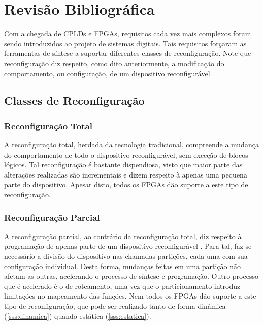 \documentclass[11pt,a4paper,oneside]{book}
\begin{document}
	\frontmatter
	\tableofcontents
	\mainmatter
	
\fi
                      
\chapter{Revis\~{a}o Bibliogr\'{a}fica}\label{CapRevisaoBibliografica}


\vspace{0.8cm}
Com a chegada de CPLDs e FPGAs, requisitos cada vez mais complexos foram sendo introduzidos ao projeto de sistemas digitais.
Tais requisitos for\c{c}aram as ferramentas de s\'i­ntese a suportar diferentes classes de reconfigura\c{c}\~ao.
Note que reconfigura\c{c}\~ao diz respeito, como dito anteriormente, a modifica\c{c}\~ao do comportamento, ou configura\c{c}\~ao, de um dispositivo reconfigur\'avel.

\section{Classes de Reconfigura\c{c}\~ao}
\subsection{Reconfigura\c{c}\~ao Total}
A reconfigura\c{c}\~ao total, herdada da tecnologia tradicional, compreende a mudan\c{c}a do comportamento de todo o dispositivo reconfigur\'avel, sem exce\c{c}\~ao de blocos l\'ogicos.
Tal reconfigura\c{c}\~ao \'e bastante dispendiosa, visto que maior parte das alterações realizadas são incrementais e dizem respeito \`a apenas uma pequena parte do dispositivo.
Apesar disto, todos os FPGAs d\~ao suporte a este tipo de reconfigura\c{c}\~ao.

\subsection{Reconfigura\c{c}\~ao Parcial}
A reconfigura\c{c}\~ao parcial, ao contr\'ario da reconfigura\c{c}\~ao total, diz respeito \`a programa\c{c}\~ao de apenas parte de um dispositivo reconfigur\'avel \cite{Hauck2007}.
Para tal, faz-se necess\'ario a divis\~ao do dispositivo nas chamadas parti\c{c}\~oes, cada uma com sua configura\c{c}\~ao individual.
Desta forma, mudan\c{c}as feitas em uma parti\c{c}\~ao n\~ao afetam as outras, acelerando o processo de s\'i­ntese e programa\c{c}\~ao.
Outro processo que \'e acelerado \'e o de roteamento, uma vez que o particionamento introduz limita\c{c}\~oes no mapeamento das fun\c{c}\~oes.
Nem todos os FPGAs d\~ao suporte a este tipo de reconfigura\c{c}\~ao, que pode ser realizado tanto de forma dinâmica (\ref{sss:dinamica}) quando estática (\ref{sss:estatica}).
\end{document}
